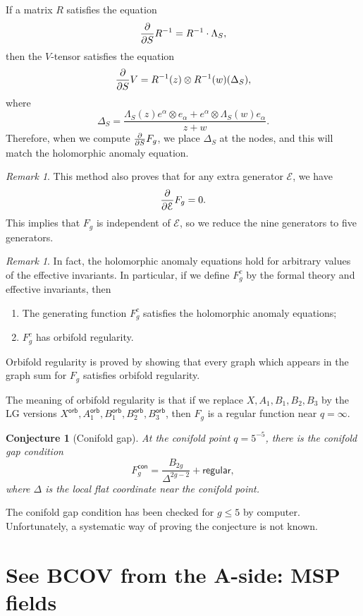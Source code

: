 \documentclass[10pt,oldfontcommands,oneside]{memoir}
\newtheorem{conj}[thm]{Conjecture}
\theoremstyle{definition}
\theoremstyle{remark}
\newtheorem{rmk}[thm]{Remark}
\theoremstyle{plain}
\theoremstyle{definition}
\theoremstyle{remark}
\newcommand{\mc}[1]{\mathcal{#1}}
\newcommand{\ms}[1]{\mathsf{#1}}
\newcommand{\1}{\mathbf{1}}
\newcommand{\2}{\mathbf{2}}
\newcommand{\3}{\mathbf{3}}
\begin{document}
If a matrix $R$ satisfies the equation
\[ \pdv{}{S} R^{-1} = R^{-1} \cdot \Lambda_S, \]
then the $V$-tensor satisfies the equation
\[ \pdv{}{S} V = R^{-1}(z) \otimes R^{-1}(w) (\Delta_S), \]
where
\[ \Delta_S = \frac{\Lambda_S(z) e^{\alpha} \otimes e_{\alpha} + e^{\alpha} \otimes \Lambda_S(w) e_{\alpha}}{z+w}. \]
Therefore, when we compute $\pdv{}{S} F_g$, we place $\Delta_S$ at the nodes, and this will match the holomorphic anomaly equation.

\begin{rmk}
    This method also proves that for any extra generator $\mc{E}$, we have
    \[ \pdv{}{\mc{E}} F_g = 0. \]
    This implies that $F_g$ is independent of $\mc{E}$, so we reduce the nine generators to five generators.
\end{rmk}

\begin{rmk}
    In fact, the holomorphic anomaly equations hold for arbitrary values of the effective invariants. In particular, if we define $F_g^c$ by the formal theory and effective invariants, then
    \begin{enumerate}
        \item The generating function $F_g^c$ satisfies the holomorphic anomaly equations;
        \item $F_g^c$ has orbifold regularity.
    \end{enumerate}
    Orbifold regularity is proved by showing that every graph which appears in the graph sum for $F_g$ satisfies orbifold regularity.
\end{rmk}

The meaning of orbifold regularity is that if we replace $X,A_1, B_1, B_2, B_3$ by the LG versions $X^{\ms{orb}}, A_1^{\ms{orb}}, B_1^{\ms{orb}}, B_2^{\ms{orb}}, B_3^{\ms{orb}}$, then $F_g$ is a regular function near $q = \infty$.

\begin{conj}[Conifold gap]
    At the conifold point $q = 5^{-5}$, there is the \textit{conifold gap condition}
    \[ F_g^{\ms{con}} = \frac{B_{2g}}{\Delta^{2g-2}} + \ms{regular}, \]
    where $\Delta$ is the local flat coordinate near the conifold point.
\end{conj}

The conifold gap condition has been checked for $g \leq 5$ by computer. Unfortunately, a systematic way of proving the conjecture is not known.



\chapter{See BCOV from the A-side: MSP fields}\thispagestyle{firstpage}
\label{pt:msp}
\end{document}
